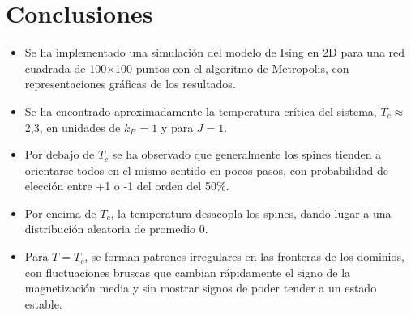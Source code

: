 \documentclass{scrartcl}
\begin{document}
\clearpage
\section{Conclusiones}
\begin{itemize}
\item Se ha implementado una simulación del modelo de Ising en 2D para una red cuadrada de 100$\times$100 puntos con el algoritmo de Metropolis, con representaciones gráficas de los resultados.
\item Se ha encontrado aproximadamente la temperatura crítica del sistema, $T_c \approx$ 2,3, en unidades de $k_B=1$ y para $J=1$.
\item Por debajo de $T_c$ se ha observado que generalmente los spines tienden a orientarse todos en el mismo sentido en pocos pasos, con probabilidad de elección entre +1 o -1 del orden del 50\%.
\item Por encima de $T_c$, la temperatura desacopla los spines, dando lugar a una distribución aleatoria de promedio 0.
\item Para $T=T_c$, se forman patrones irregulares en las fronteras de los dominios, con fluctuaciones bruscas que cambian rápidamente el signo de la magnetización media y sin mostrar signos de poder tender a un estado estable.
\end{itemize}
\end{document}
